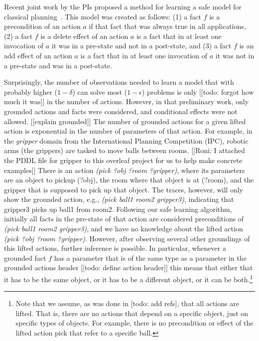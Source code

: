 \documentclass[12pt]{article}
\begin{document}
Recent joint work by the PIs proposed a method for learning a safe model for classical planning~\cite{stern2017efficientAndSafe}. This model was created as follows: 
(1) a fact $f$ is a precondition of an action $a$ if that fact that was always true in all applications, 
(2) a fact $f$ is a delete effect of an action $a$ is a fact 
that in at least one invocation of $a$ it was in a pre-state and not in a post-state, and 
(3) a fact $f$ is an add effect of an action $a$ is a fact 
that in at least one invocation of $a$ it was not in a pre-state and was in a post-state. 


Surprisingly, the number of observations needed to learn a model that with probably higher ($1-\delta$) can solve most ($1-\epsilon$) problems is only [[todo: forgot how much it was]] in the number of actions. However, in that preliminary work, only grounded actions and facts were considered, and conditional effects were not allowed. [[explain grounded]] 
The number of grounded actions for a given lifted action is exponential in the number of parameters of that action. For example, in the \emph{gripper} domain from the International Planning Competition (IPC), robotic arms (the grippers) are tasked to move balls between rooms. [[Roni: I attached the PDDL file for gripper to this overleaf project for us to help make concrete examples]]
There is an action \emph{(pick ?obj ?room ?gripper)}, where its parameters are
an object to pickup (?obj), the room where that object is at (?room), and the gripper that is supposed to pick up that object. The traces, however, will only show the grounded action, e.g., 
\emph{(pick ball1 room2 gripper3)}, indicating that gripper3 picks up ball1 from room2. 
Following our safe learning algorithm, initially all facts in the pre-state of that action 
are considered preconditions of \emph{(pick ball1 room2 gripper3)}, 
and we have no knowledge about the lifted action \emph{(pick ?obj ?room ?gripper)}. 
However, after observing several other groundings of this lifted actions, further inference is possible. 
In particular, whenever a grounded fact $f$ has a parameter that is of the same type
as a parameter in the grounded actions header [[todo: define action header]]
this means that either that it has to be the same object, or it has to be a different object, or it can be both.\footnote{Note that we assume, as was done in [todo: add refs], that all actions are lifted. That is, there are no actions that depend on a specific object, just on specific types of objects. For example, there is no precondition or effect of the lifted action pick that refer to a specific ball.}  
\end{document}
